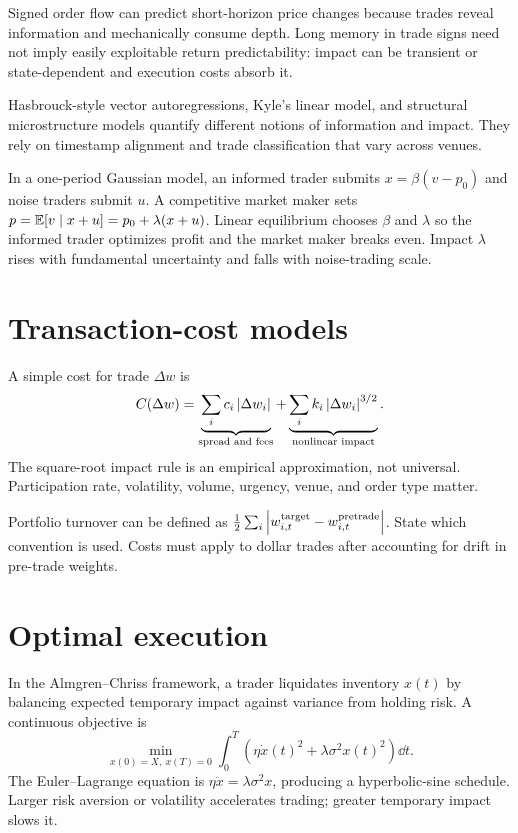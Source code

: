 Signed order flow can predict short-horizon price changes because trades reveal
information and mechanically consume depth. Long memory in trade signs need not
imply easily exploitable return predictability: impact can be transient or
state-dependent and execution costs absorb it.

Hasbrouck-style vector autoregressions, Kyle's linear model, and structural
microstructure models quantify different notions of information and impact. They
rely on timestamp alignment and trade classification that vary across venues.

\begin{example}
In a one-period Gaussian model, an informed trader submits $x=\beta(v-p_0)$ and noise
traders submit $u$. A competitive market maker sets
$p=\operatorname{\mathbb E}[v\mid x+u]=p_0+\lambda(x+u)$. Linear equilibrium chooses $\beta$ and
$\lambda$ so the informed trader optimizes profit and the market maker breaks even.
Impact $\lambda$ rises with fundamental uncertainty and falls with noise-trading
scale.
\end{example}

\section{Transaction-cost models}

A simple cost for trade $\Delta w$ is
\[
C(\Delta w)=
\underbrace{\sum_i c_i\left|\Delta w_i\right|}_{\text{spread and fees}}
+\underbrace{\sum_i k_i\left|\Delta w_i\right|^{3/2}}_{\text{nonlinear impact}}.
\]
The square-root impact rule is an empirical approximation, not universal. Participation
rate, volatility, volume, urgency, venue, and order type matter.

Portfolio turnover can be defined as
$\frac12\sum_i\left|w_{i,t}^{\mathrm{target}}-w_{i,t}^{\mathrm{pretrade}}\right|$.
State which convention is used. Costs must apply to dollar trades after accounting
for drift in pre-trade weights.

\section{Optimal execution}

In the Almgren--Chriss framework, a trader liquidates inventory $x(t)$ by balancing
expected temporary impact against variance from holding risk. A continuous
objective is
\[
\min_{x(0)=X,\ x(T)=0}
\int_0^T\left(\eta\dot x(t)^2+
\lambda\sigma^2x(t)^2\right)\dd t.
\]
The Euler--Lagrange equation is
$\eta\ddot x=\lambda\sigma^2x$, producing a hyperbolic-sine schedule. Larger risk
aversion or volatility accelerates trading; greater temporary impact slows it.

